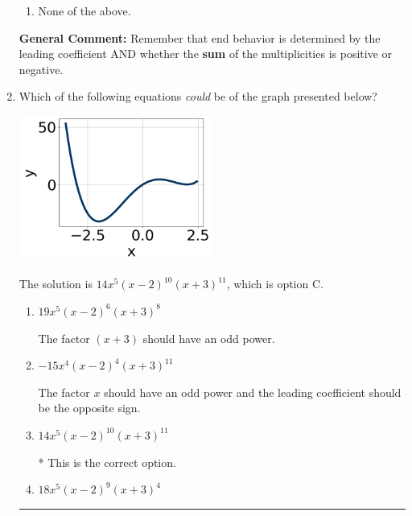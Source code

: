 \documentclass{extbook}[14pt]
\newcommand{\litem}[1]{\item #1

\rule{\textwidth}{0.4pt}}
\begin{document}
\begin{enumerate}
{\begin{enumerate}[label=\Alph*.]
\item None of the above.\end{enumerate}
\textbf{General Comment:} Remember that end behavior is determined by the leading coefficient AND whether the \textbf{sum} of the multiplicities is positive or negative.
}
\litem{
Which of the following equations \textit{could} be of the graph presented below?

\begin{center}
    \includegraphics[width=0.5\textwidth]{../Figures/polyGraphToFunctionCopyB.png}
\end{center}



The solution is \( 14x^{5} (x - 2)^{10} (x + 3)^{11} \), which is option C.\begin{enumerate}[label=\Alph*.]
\item \( 19x^{5} (x - 2)^{6} (x + 3)^{8} \)

The factor $(x + 3)$ should have an odd power.
\item \( -15x^{4} (x - 2)^{4} (x + 3)^{11} \)

The factor $x$ should have an odd power and the leading coefficient should be the opposite sign.
\item \( 14x^{5} (x - 2)^{10} (x + 3)^{11} \)

* This is the correct option.
\item \( 18x^{5} (x - 2)^{9} (x + 3)^{4} \)


\end{enumerate}}
\end{enumerate}
\end{document}
